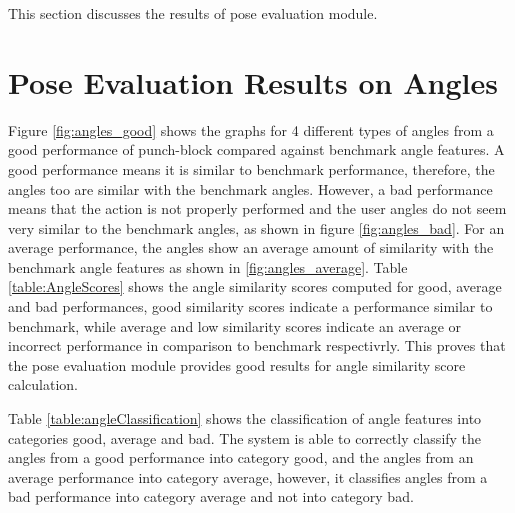 This section discusses the results of pose evaluation module. 

\section{Pose Evaluation Results on Angles}

Figure \ref{fig:angles_good} shows the graphs for 4 different types of angles from a good performance of punch-block compared against benchmark angle features. A good performance means it is similar to benchmark performance, therefore, the angles too are similar with the benchmark angles. However, a bad performance means that the action is not properly performed and the user angles do not seem very similar to the benchmark angles, as shown in figure \ref{fig:angles_bad}. For an average performance, the angles show an average amount of similarity with the benchmark angle features as shown in \ref{fig:angles_average}. Table \ref{table:AngleScores} shows the angle similarity scores computed for good, average and bad performances, good similarity scores indicate a performance similar to benchmark, while average and low similarity scores indicate an average or incorrect performance in comparison to benchmark respectivrly. This proves that the pose evaluation module provides good results for angle similarity score calculation. 

Table \ref{table:angleClassification} shows the classification of angle features into categories good, average and bad. The system is able to correctly classify the angles from a good performance into category good, and the angles from an average performance into category average, however, it classifies angles from a bad performance into category average and not into category bad. 

\bigskip

